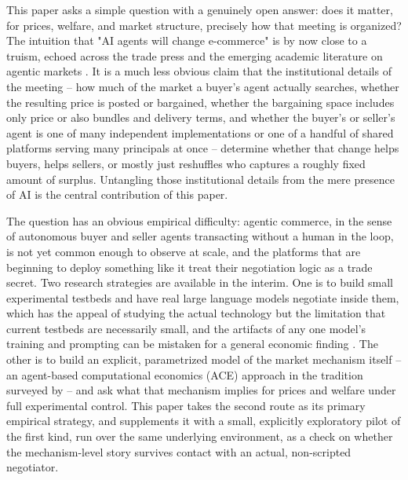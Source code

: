 \documentclass[review]{elsarticle}
\begin{document}
This paper asks a simple question with a genuinely open answer: does it matter, for prices, welfare, and market structure, precisely how that meeting is organized? The intuition that "AI agents will change e-commerce" is by now close to a truism, echoed across the trade press and the emerging academic literature on agentic markets \citep{bichler2026agentic,shahidi2025coasean,hadfield2025economy}. It is a much less obvious claim that the institutional details of the meeting -- how much of the market a buyer's agent actually searches, whether the resulting price is posted or bargained, whether the bargaining space includes only price or also bundles and delivery terms, and whether the buyer's or seller's agent is one of many independent implementations or one of a handful of shared platforms serving many principals at once -- determine whether that change helps buyers, helps sellers, or mostly just reshuffles who captures a roughly fixed amount of surplus. Untangling those institutional details from the mere presence of AI is the central contribution of this paper.

The question has an obvious empirical difficulty: agentic commerce, in the sense of autonomous buyer and seller agents transacting without a human in the loop, is not yet common enough to observe at scale, and the platforms that are beginning to deploy something like it treat their negotiation logic as a trade secret. Two research strategies are available in the interim. One is to build small experimental testbeds and have real large language models negotiate inside them, which has the appeal of studying the actual technology but the limitation that current testbeds are necessarily small, and the artifacts of any one model's training and prompting can be mistaken for a general economic finding \citep{bianchi2024negotiationarena,zhu2025automated,bansal2025magentic}. The other is to build an explicit, parametrized model of the market mechanism itself -- an agent-based computational economics (ACE) approach in the tradition surveyed by \citet{tesfatsion2006agent} -- and ask what that mechanism implies for prices and welfare under full experimental control. This paper takes the second route as its primary empirical strategy, and supplements it with a small, explicitly exploratory pilot of the first kind, run over the same underlying environment, as a check on whether the mechanism-level story survives contact with an actual, non-scripted negotiator.
\end{document}
